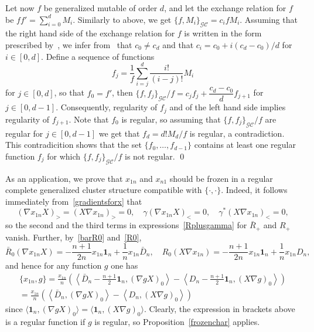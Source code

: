 \documentclass{amsart}
\theoremstyle{definition}
\theoremstyle{remark}
\numberwithin{equation}{section}
\numberwithin{theorem}{section}
\def\CC{{\mathcal C}}
\def\G{{\mathcal G}}
\def\one{\mathbf 1}
\def\Poi{{\{{\cdot},{\cdot}\}}}
\begin{document}
Let now $f$ be generalized mutable of order $d$, and let the exchange relation for $f$ be 
$ff'=\sum_{i=0}^d M_i$. Similarly to above, we get $\{f,M_i\}_{\G\CC}=c_ifM_i$. Assuming that the right hand side of the
exchange relation for $f$ is written in the form prescribed by~\cite[Eq.~(2.4)]{GSVdouble}, we infer 
from~\cite[Proposition 2.5]{GSVdouble} that $c_0\ne c_d$ and that $c_i=c_0+i(c_d-c_0)/d$ for $i\in [0,d]$. Define 
a sequence of functions 
$$
f_j=\dfrac1f\sum_{i=j}^d\dfrac{i!}{(i-j)!}M_i
$$ 
for $j\in[0,d]$, so that $f_0=f'$, then $\{f,f_j\}_{\G\CC}/f=c_jf_j+\dfrac{c_d-c_0}{d}f_{j+1}$ for $j\in[0,d-1]$.
Consequently, regularity of $f_j$ and of the left hand side implies regularity of $f_{j+1}$. Note that $f_0$ is regular, so assuming that $\{f,f_j\}_{\G\CC}/f$ are regular for $j\in [0,d-1]$ we get that $f_d=d!M_d/f$ is regular,  a contradiction. This contradicition shows that the set $\{f_0,\dots,f_{d-1}\}$ contains at least one regular function $f_j$ for which  $\{f,f_j\}_{\G\CC}/f$ is not regular.
\qed

As an application, we prove that $x_{1n}$ and $x_{n1}$ should be frozen in a regular complete generalized cluster structure compatible with $\Poi$. Indeed, it follows immediately from~\eqref{gradientsforx} that
\[
(\nabla x_{1n}X)_>=(X\nabla x_{1n})_>=0,\quad \gamma(\nabla x_{1n}X)_<=0,
\quad \gamma^*(X\nabla x_{1n})_<=0,
\]
so the second and the third terms in expressions~\eqref{Rplusgamma} for $\bar R_+$ and $R_+$ vanish.
Further, by~\eqref{barR0} and~\eqref{R0}, 
\[
\bar R_0(\nabla x_{1n}X)=-\frac{n+1}{2n}x_{1n}\one_n+\frac1n x_{1n}\bar D_n,\quad
R_0(X\nabla x_{1n})=-\frac{n+1}{2n}x_{1n}\one_n+\frac1n x_{1n}D_n,
\]
and hence for any function $g$ one has 
\begin{multline}\label{x1nsigizmund}
\{x_{1n},g\}=\frac{x_{1n}}n\left(\left\langle \bar D_n-\frac{n+1}2\one_n, (\nabla g X)_0\right\rangle-
\left\langle D_n-\frac{n+1}2\one_n, (X\nabla g)_0 \right\rangle\right)\\
=\frac{x_{1n}}n\left(\left\langle \bar D_n, (\nabla g X)_0\right\rangle-\left\langle D_n,(X\nabla g)_0 \right\rangle\right)
\end{multline}
since $\langle \one_n, (\nabla g X)_0\rangle=\langle \one_n, (X\nabla g)_0\rangle$.
Clearly, the expression in brackets above is a regular function if $g$ is regular, so Proposition~\ref{frozenchar} applies.
\end{document}
